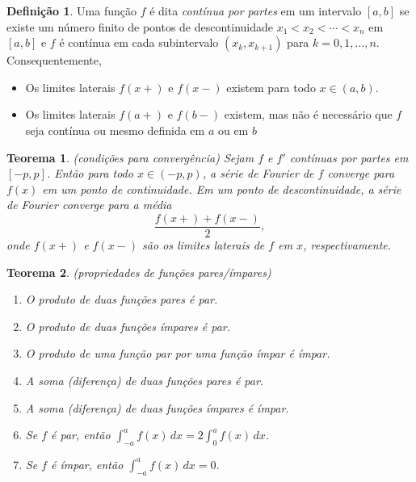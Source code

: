 \documentclass[12pt]{article}
\theoremstyle{plain}
\newtheorem{thm}{Teorema}[section]
\theoremstyle{definition}
\newtheorem{defn}{Definição}[section]
\theoremstyle{remark}
\begin{document}
\begin{defn}
    Uma função \(f\) é dita \emph{contínua por partes} em um intervalo \([a,b]\) se existe um número finito de pontos de descontinuidade \(x_1<x_2<\cdots<x_n\) em \([a,b]\) e \(f\) é contínua em cada subintervalo \((x_k, x_{k+1})\) para \(k=0,1,\ldots,n\). Consequentemente,
    \begin{itemize}
        \item Os limites laterais \(f(x+)\) e \(f(x-)\) existem para todo \(x \in (a,b)\).
        \item Os limites laterais \(f(a+)\) e \(f(b-)\) existem, mas não é necessário que \(f\) seja contínua ou mesmo definida em \(a\) ou em \(b\)
    \end{itemize}
\end{defn}

\begin{thm} (condições para convergência)
    Sejam \(f\) e \(f'\) contínuas por partes em \([-p,p]\). Então para todo \(x \in (-p,p)\), a série de Fourier de \(f\) converge para \(f(x)\) em um ponto de continuidade. Em um ponto de descontinuidade, a série de Fourier converge para a média
    \begin{equation*}
        \frac{f(x+) + f(x-)}{2},
    \end{equation*}
    \noindent onde \(f(x+)\) e \(f(x-)\) são os limites laterais de \(f\) em \(x\), respectivamente.
\end{thm}

\begin{thm} (propriedades de funções pares/ímpares)
    \begin{enumerate}
        \item[\textup{(a)}] O produto de duas funções pares é par.
        \item[\textup{(b)}] O produto de duas funções ímpares é par.
        \item[\textup{(c)}] O produto de uma função par por uma função ímpar é ímpar.
        \item[\textup{(d)}] A soma (diferença) de duas funções pares é par.
        \item[\textup{(e)}] A soma (diferença) de duas funções ímpares é ímpar.
        \item[\textup{(f)}] Se \(f\) é par, então \(\int_{-a}^{a} f(x) \, dx = 2\int_{0}^{a} f(x) \, dx\).
        \item[\textup{(g)}] Se \(f\) é ímpar, então \(\int_{-a}^{a} f(x) \, dx = 0\).
    \end{enumerate}
\end{thm}
\end{document}
